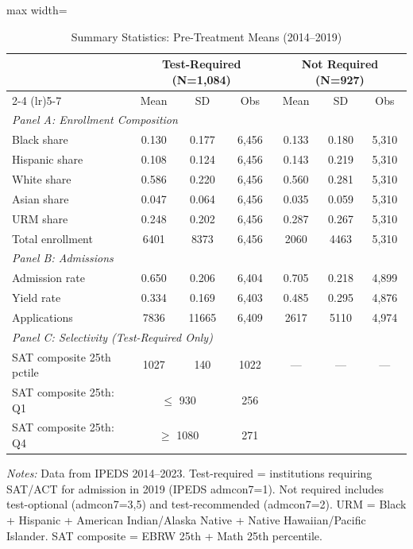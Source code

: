 \begin{table}[htbp]
\centering
\caption{Summary Statistics: Pre-Treatment Means (2014--2019)}
\label{tab:summary}
\begin{adjustbox}{max width=\textwidth}
\begin{tabular}{lcccccc}
\hline\hline
 & \multicolumn{3}{c}{Test-Required (N=1,084)} & \multicolumn{3}{c}{Not Required (N=927)} \\
\cmidrule(lr){2-4} \cmidrule(lr){5-7}
 & Mean & SD & Obs & Mean & SD & Obs \\
\hline
\multicolumn{7}{l}{\textit{Panel A: Enrollment Composition}} \\
Black share & 0.130 & 0.177 & 6,456 & 0.133 & 0.180 & 5,310 \\
Hispanic share & 0.108 & 0.124 & 6,456 & 0.143 & 0.219 & 5,310 \\
White share & 0.586 & 0.220 & 6,456 & 0.560 & 0.281 & 5,310 \\
Asian share & 0.047 & 0.064 & 6,456 & 0.035 & 0.059 & 5,310 \\
URM share & 0.248 & 0.202 & 6,456 & 0.287 & 0.267 & 5,310 \\
Total enrollment & 6401 & 8373 & 6,456 & 2060 & 4463 & 5,310 \\
\hline
\multicolumn{7}{l}{\textit{Panel B: Admissions}} \\
Admission rate & 0.650 & 0.206 & 6,404 & 0.705 & 0.218 & 4,899 \\
Yield rate & 0.334 & 0.169 & 6,403 & 0.485 & 0.295 & 4,876 \\
Applications & 7836 & 11665 & 6,409 & 2617 & 5110 & 4,974 \\
\hline
\multicolumn{7}{l}{\textit{Panel C: Selectivity (Test-Required Only)}} \\
SAT composite 25th pctile & 1027 & 140 & 1022 & --- & --- & --- \\
SAT composite 25th: Q1 & \multicolumn{2}{c}{$\leq$ 930} & 256 & & & \\
SAT composite 25th: Q4 & \multicolumn{2}{c}{$\geq$ 1080} & 271 & & & \\
\hline\hline
\end{tabular}
\end{adjustbox}
\begin{tablenotes}[flushleft]
\small
\item \textit{Notes:} Data from IPEDS 2014--2023. Test-required = institutions requiring SAT/ACT for admission in 2019 (IPEDS admcon7=1). Not required includes test-optional (admcon7=3,5) and test-recommended (admcon7=2). URM = Black + Hispanic + American Indian/Alaska Native + Native Hawaiian/Pacific Islander. SAT composite = EBRW 25th + Math 25th percentile.
\end{tablenotes}
\end{table}
